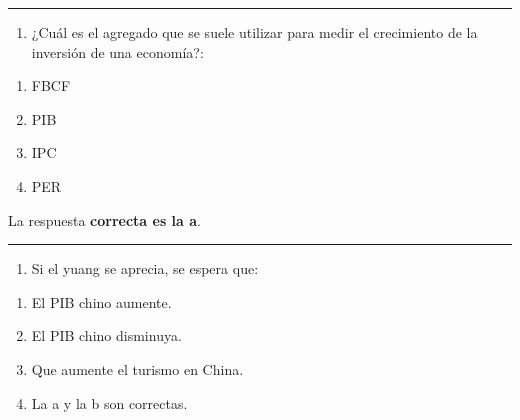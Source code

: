 \documentclass[
  letterpaper,
  DIV=11,
  numbers=noendperiod]{scrreprt}
\providecommand{\tightlist}{%
  \setlength{\itemsep}{0pt}\setlength{\parskip}{0pt}}\usepackage{longtable,booktabs,array}
\begin{document}
\begin{center}\rule{0.5\linewidth}{0.5pt}\end{center}

\begin{enumerate}
\def\labelenumi{\arabic{enumi}.}
\setcounter{enumi}{53}
\tightlist
\item
  ¿Cuál es el agregado que se suele utilizar para medir el crecimiento
  de la inversión de una economía?:
\end{enumerate}

\begin{enumerate}
\def\labelenumi{\alph{enumi}.}
\item
  FBCF
\item
  PIB
\item
  IPC
\item
  PER
\end{enumerate}

\begin{tcolorbox}[enhanced jigsaw, left=2mm, opacityback=0, colback=white, breakable, arc=.35mm, bottomrule=.15mm, rightrule=.15mm, toprule=.15mm, leftrule=.75mm, colframe=quarto-callout-tip-color-frame]
\begin{minipage}[t]{5.5mm}
\textcolor{quarto-callout-tip-color}{\faLightbulb}
\end{minipage}%
\begin{minipage}[t]{\textwidth - 5.5mm}

La respuesta \textbf{correcta es la a}.

\end{minipage}%
\end{tcolorbox}

\begin{center}\rule{0.5\linewidth}{0.5pt}\end{center}

\begin{enumerate}
\def\labelenumi{\arabic{enumi}.}
\setcounter{enumi}{54}
\tightlist
\item
  Si el yuang se aprecia, se espera que:
\end{enumerate}

\begin{enumerate}
\def\labelenumi{\alph{enumi}.}
\item
  El PIB chino aumente.
\item
  El PIB chino disminuya.
\item
  Que aumente el turismo en China.
\item
  La a y la b son correctas.
\end{enumerate}
\end{document}
